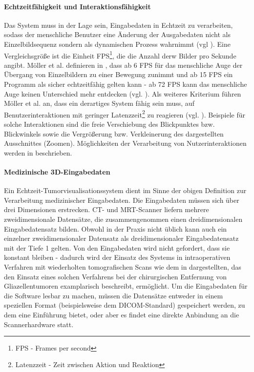 \documentclass[pdftex,a4paper,titlepage,12pt]{scrartcl}
\newtheorem[L]{boxedDefinition}{Definition}
\begin{document}
\paragraph{Echtzeitfähigkeit und Interaktionsfähigkeit} \label{p:rtcapability} Das System muss in der Lage sein, Eingabedaten in Echtzeit zu verarbeiten, sodass der menschliche Benutzer eine Änderung der Ausgabedaten nicht als Einzelbildsequenz sondern als dynamischen Prozess wahrnimmt (vgl \cite[Kapitel 1, Seite 1]{Moeller2008}). Eine Vergleichsgröße ist die Einheit FPS\footnote{FPS - Frames per second}, die die Anzahl derw Bilder pro Sekunde angibt. Möller et al. definieren in \cite{Moeller2008}, dass ab 6 FPS für das menschliche Auge der Übergang von Einzelbildern zu einer Bewegung zunimmt und ab 15 FPS ein Programm als sicher echtzeitfähig gelten kann - ab 72 FPS kann das menschliche Auge keinen Unterschied mehr entdecken (vgl. \cite[Kapitel 1, Seite 1]{Moeller2008}). Als weiteres Kriterium führen Möller et al. an, dass ein derartiges System fähig sein muss, auf Benutzerinteraktionen mit geringer Latenzzeit\footnote{Latenzzeit - Zeit zwischen Aktion und Reaktion} zu reagieren (vgl. \cite[Kapitel 1, Seite 1]{Moeller2008}). Beispiele für solche Interaktionen sind die freie Verschiebung des Blickpunktes bzw. Blickwinkels sowie die Vergrößerung bzw. Verkleinerung des dargestellten Ausschnittes (\glqq Zoomen\grqq). Möglichkeiten der Verarbeitung von Nutzerinteraktionen werden in \cite[Kapitel 3.6, Seite 62-66]{Bruckner2004} beschrieben.

\paragraph{Medizinische 3D-Eingabedaten} Ein Echtzeit-Tumorvisualisationssystem dient im Sinne der obigen Definition zur Verarbeitung medizinischer Eingabedaten. Die Eingabedaten müssen sich über drei Dimensionen erstrecken. CT- und MRT-Scanner liefern mehrere zweidimensionale Datensätze, die zusammengenommen einen dreidimensionalen Eingabedatensatz bilden. Obwohl in der Praxis nicht üblich kann auch ein einzelner zweidimensionaler Datensatz als dreidimensionaler Eingabedatensatz mit der Tiefe 1 gelten.  Von den Eingabedaten wird nicht gefordert, dass sie konstant bleiben - dadurch wird der Einsatz des Systems in intraoperativen Verfahren mit wiederholten tomografischen Scans wie dem in \cite{Okudera1994} dargestellten, das den Einsatz eines solchen Verfahrens bei der chirurgischen Entfernung von Gliazellentumoren examplarisch beschreibt, ermöglicht. Um die Eingabedaten für die Software lesbar zu machen, müssen die Datensätze entweder in einem speziellen Format (beispielsweise dem DICOM-Standard) gespeichert werden, zu dem \cite{Mildenberger2002} eine Einführung bietet, oder aber es findet eine direkte Anbindung an die Scannerhardware statt.
\end{document}
